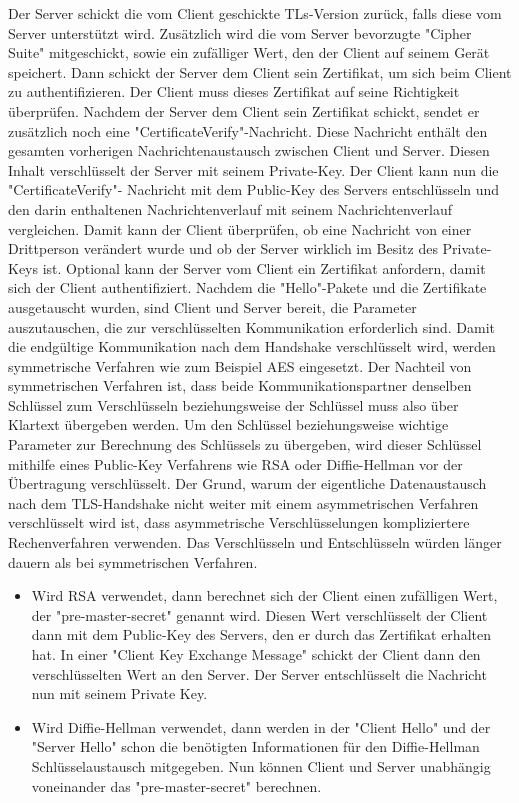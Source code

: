 Der Server schickt die vom Client geschickte TLs-Version zurück, falls diese vom Server unterstützt wird. Zusätzlich wird die vom Server bevorzugte "Cipher Suite" mitgeschickt, sowie ein zufälliger Wert, den der Client auf seinem Gerät speichert. Dann schickt der Server dem Client sein Zertifikat, um sich beim Client zu authentifizieren. Der Client muss dieses Zertifikat auf seine Richtigkeit überprüfen. Nachdem der Server dem Client sein Zertifikat schickt, sendet er zusätzlich noch eine "CertificateVerify"-Nachricht. Diese Nachricht enthält den gesamten vorherigen Nachrichtenaustausch zwischen Client und Server. Diesen Inhalt verschlüsselt der Server mit seinem Private-Key. Der Client kann nun die "CertificateVerify"- Nachricht mit dem Public-Key des Servers entschlüsseln und den darin enthaltenen Nachrichtenverlauf mit seinem Nachrichtenverlauf vergleichen. Damit kann der Client überprüfen, ob eine Nachricht von einer Drittperson verändert wurde und ob der Server wirklich im Besitz des Private-Keys ist. Optional kann der Server vom Client ein Zertifikat anfordern, damit sich der Client authentifiziert. 
Nachdem die "Hello"-Pakete und die Zertifikate ausgetauscht wurden, sind Client und Server bereit, die Parameter auszutauschen, die zur verschlüsselten Kommunikation erforderlich sind. Damit die endgültige Kommunikation nach dem Handshake verschlüsselt wird, werden symmetrische Verfahren wie zum Beispiel AES eingesetzt. Der Nachteil von symmetrischen Verfahren ist, dass beide Kommunikationspartner denselben Schlüssel zum Verschlüsseln beziehungsweise der Schlüssel muss also über Klartext übergeben werden. Um den Schlüssel beziehungsweise wichtige Parameter zur Berechnung des Schlüssels zu übergeben, wird dieser Schlüssel mithilfe eines Public-Key Verfahrens wie RSA oder Diffie-Hellman vor der Übertragung verschlüsselt. Der Grund, warum der eigentliche Datenaustausch nach dem TLS-Handshake nicht weiter mit einem asymmetrischen Verfahren verschlüsselt wird ist, dass asymmetrische Verschlüsselungen kompliziertere Rechenverfahren verwenden. Das Verschlüsseln und Entschlüsseln würden länger dauern als bei symmetrischen Verfahren. \cite{WikiTLS}

\begin{itemize}
    \item Wird RSA verwendet, dann berechnet sich der Client einen zufälligen Wert, der "pre-master-secret" genannt wird. Diesen Wert verschlüsselt der Client dann mit dem Public-Key des Servers, den er durch das Zertifikat erhalten hat. In einer "Client Key Exchange Message" schickt der Client dann den verschlüsselten Wert an den Server. Der Server entschlüsselt die Nachricht nun mit seinem Private Key.
    \item Wird Diffie-Hellman verwendet, dann werden in der "Client Hello" und der "Server Hello" schon die benötigten Informationen für den Diffie-Hellman Schlüsselaustausch mitgegeben. Nun können Client und Server unabhängig voneinander das "pre-master-secret" berechnen.
\end{itemize}

